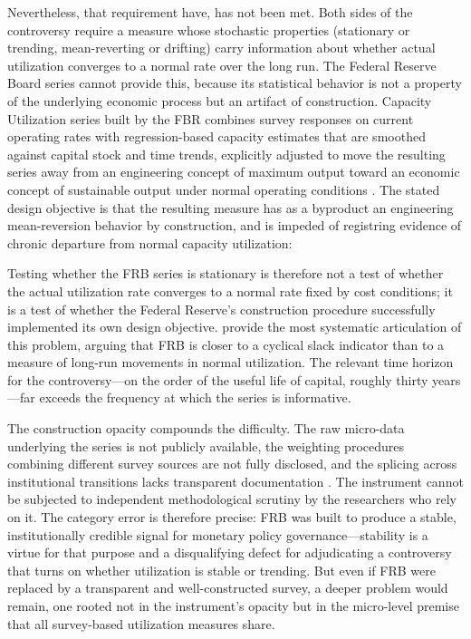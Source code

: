 \documentclass[11pt,a4paper]{article}
\begin{document}
Nevertheless, that requirement have, has not been met. Both sides of the controversy require a measure whose stochastic properties (stationary or trending, mean-reverting or drifting) carry information about whether actual utilization converges to a normal rate over the long run. The Federal Reserve Board series cannot provide this, because its statistical behavior is not a property of the underlying economic process but an artifact of construction. Capacity Utilization series built by the FBR combines survey responses on current operating
rates with regression-based capacity estimates that are smoothed against capital stock and time trends, explicitly adjusted to move the resulting series away from an engineering concept of maximum output toward an economic concept of sustainable output under normal operating conditions \citep{Shapiro1989}. The stated design objective is that
the resulting measure has as a byproduct an engineering mean-reversion behavior by construction, and is impeded of registring evidence of chronic departure from normal capacity utilization: 

Testing whether the FRB series is stationary is therefore not a test of whether the actual utilization rate converges to a normal rate fixed by cost conditions; it is a test of whether the Federal Reserve's construction procedure successfully implemented its own design objective. \citet{Nikiforos2016,Nikiforos2021} provide the most
systematic articulation of this problem, arguing that FRB is closer to a cyclical slack indicator than to a measure of long-run movements in normal utilization. The relevant time horizon for the controversy---on the order of the useful life of capital, roughly thirty years---far exceeds the frequency at which the series is informative.

The construction opacity compounds the difficulty. The raw micro-data underlying the series is not publicly available, the weighting procedures combining different survey sources are not fully disclosed,
and the splicing across institutional transitions lacks transparent documentation \citep{Board2017}. The instrument cannot be subjected to independent methodological scrutiny by the researchers who rely on it. The category error is therefore precise: FRB was built to produce a stable, institutionally credible signal for monetary policy governance---stability is a virtue for that purpose and a disqualifying defect for adjudicating a controversy that turns on whether utilization is stable or trending. But even if FRB were replaced by a transparent and well-constructed survey, a deeper problem would remain, one rooted not in the instrument's opacity but in the micro-level premise that all survey-based utilization measures share.
\end{document}
